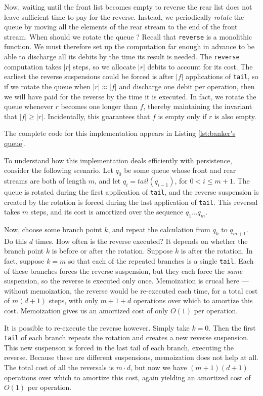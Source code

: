 \documentclass[12pt, a4paper]{article} %
\newcommand{\code}[1]{\texttt{#1}} %
\begin{document}
Now, waiting until the front list becomes empty to reverse the rear list does not leave sufficient time to pay for the reverse. Instead, we periodically \textit{rotate} the queue by moving all the elements of the rear stream to the end of the front stream. When should we rotate the queue ? Recall that \code{reverse} is a monolithic function. We must therefore set up the computation far enough in advance to be able to discharge all its debits by the time its result is needed. The \code{reverse} computation takes $|r|$ steps, so we allocate $|r|$ debits to account for its cost. The earliest the reverse suspensions could be forced is after $|f|$ applications of \code{tail}, so if we rotate the queue when $|r| \approx |f|$ and discharge one debit per operation, then we will have paid for the reverse by the time it is executed. In fact, we rotate the queue whenever $r$ becomes one longer than $f$, thereby maintaining the invariant that $|f| \geq |r|$. Incidentally, this guarantees that $f$ is empty only if $r$ is also empty.

The complete code for this implementation appears in Listing \ref{lst:banker's queue}.

To understand how this implementation deals efficiently with persistence, consider the following scenario. Let $q_0$ be some queue whose front and rear streams are both of length $m$, and let $q_i = tail(q_{i-1})$, for $0 < i \leq m + 1$. The queue is rotated during the first application of \code{tail}, and the reverse suspension is created by the rotation is forced during the last application of \code{tail}. This reversal takes $m$ steps, and its cost is amortized over the sequence $q_1 \ldots q_m$.

Now, choose some branch point $k$, and repeat the calculation from $q_k$ to $q_{m+1}$. Do this $d$ times. How often is the reverse executed? It depends on whether the branch point $k$ is before or after the rotation. Suppose $k$ is after the rotation. In fact, suppose $k = m$ so that each of the repeated branches is a single \code{tail}. Each of these branches forces the reverse suspension, but they each force the \textit{same} suspension, so the reverse is executed only once. Memoization is crucal here --- without memoization, the reverse would be re-executed each time, for a total cost of ${m(d+1)}$ steps, with only ${m + 1 + d}$ operations over which to amortize this cost. Memoization gives us an amortized cost of only $O(1)$ per operation.

It is possible to re-execute the reverse however. Simply take $k = 0$. Then the first \code{tail} of each branch repeats the rotation and creates a new reverse suspension. This new suspenson is forced in the last tail of each branch, executing the reverse. Because these are different suspensions, memoization does not help at all. The total cost of all the reversals is $m \cdot d$, but now we have ${(m + 1)(d + 1)}$ operations over which to amortize this cost, again yielding an amortized cost of $O(1)$ per operation.
\end{document}

